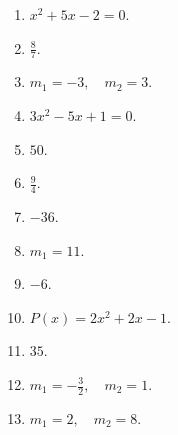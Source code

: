 \documentclass[11pt,a4paper]{article}
\begin{document}
\begin{enumerate}
\item \(x^2+5x-2=0\).
\item \(\frac{8}{7}\).
\item \(m_1=-3,\quad m_2=3\).
\item \(3x^2-5x+1=0\).
\item \(50\).
\item \(\frac{9}{4}\).
\item \(-36\).
\item \(m_1=11\).
\item \(-6\).
\item \(P(x)=2x^2+2x-1\).
\item \(35\).
\item \(m_1=-\frac{3}{2},\quad m_2=1\).
\item \(m_1=2,\quad m_2=8\).
\end{enumerate}
\endgroup
\end{document}
